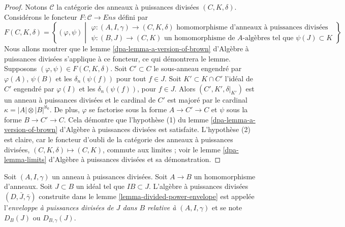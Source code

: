 \begin{proof}
Notons $\mathcal{C}$ la catégorie des anneaux à puissances divisées
$(C, K, \delta)$. Considérons le foncteur
$F : \mathcal{C} \longrightarrow \textit{Ens}$ défini par
$$
F(C, K, \delta) =
\left\{
(\varphi, \psi)
\middle|
\begin{matrix}
\varphi : (A, I, \gamma) \to (C, K, \delta)
\text{ homomorphisme d'anneaux à puissances divisées} \\
\psi : (B, J) \to (C, K)\text{ un homomorphisme de }
A\text{-algèbres tel que }\psi(J) \subset K
\end{matrix}
\right\}
$$
Nous allons montrer que
le lemme \ref{dpa-lemma-a-version-of-brown} d'Algèbre à puissances divisées
s'applique à ce foncteur, ce qui
démontrera le lemme. Supposons $(\varphi, \psi) \in F(C, K, \delta)$.
Soit $C' \subset C$ le sous-anneau engendré par $\varphi(A)$,
$\psi(B)$ et les $\delta_n(\psi(f))$ pour tout $f \in J$.
Soit $K' \subset K \cap C'$ l'idéal de $C'$ engendré par
$\varphi(I)$ et les $\delta_n(\psi(f))$, pour $f \in J$.
Alors $(C', K', \delta|_{K'})$ est un anneau à puissances divisées et
le cardinal de $C'$ est majoré par le cardinal
$\kappa = |A| \otimes |B|^{\aleph_0}$.
De plus, $\varphi$ se factorise sous la forme $A \to C' \to C$ et $\psi$
sous la forme $B \to C' \to C$. Cela démontre que l'hypothèse (1) du
lemme \ref{dpa-lemma-a-version-of-brown} d'Algèbre à puissances divisées
est satisfaite. L'hypothèse (2) est claire,
car le foncteur d'oubli de la catégorie des anneaux à puissances divisées,
$(C, K, \delta) \mapsto (C, K)$, commute aux limites ; voir le
lemme \ref{dpa-lemma-limits} d'Algèbre à puissances divisées et sa démonstration.
\end{proof}

\begin{definition}
\label{definition-divided-power-envelope}
Soit $(A, I, \gamma)$ un anneau à puissances divisées.
Soit $A \to B$ un homomorphisme d'anneaux. Soit $J \subset B$ un idéal
tel que $IB \subset J$. L'algèbre à puissances divisées $(D, \bar J, \bar\gamma)$
construite dans le lemme \ref{lemma-divided-power-envelope}
est appelée l'{\it enveloppe à puissances divisées de $J$ dans $B$
relative à $(A, I, \gamma)$} et se note $D_B(J)$ ou $D_{B, \gamma}(J)$.
\end{definition}

